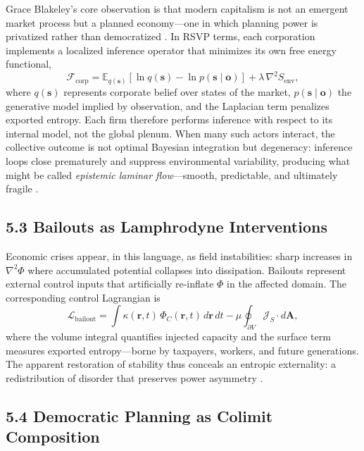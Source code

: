 \documentclass[11pt,a4paper,titlepage]{article}
\theoremstyle{definition}
\begin{document}
Grace Blakeley’s core observation is that modern capitalism is not an emergent
market process but a planned economy—one in which planning power is privatized
rather than democratized \cite{blakeley2024,mirowski2013}.
In RSVP terms, each corporation implements a localized inference operator that
minimizes its own free energy functional,
\begin{equation}
\mathcal{F}_{\text{corp}}
   = \mathbb{E}_{q(\mathbf{s})}
     [\ln q(\mathbf{s}) - \ln p(\mathbf{s}\!\mid\!\mathbf{o})]
     + \lambda\,\nabla^{2}S_{\text{env}},
\label{eq:corp_inference}
\end{equation}
where $q(\mathbf{s})$ represents corporate belief over states of the market,
$p(\mathbf{s}\!\mid\!\mathbf{o})$ the generative model implied by observation,
and the Laplacian term penalizes exported entropy.
Each firm therefore performs inference with respect to its internal model,
not the global plenum.
When many such actors interact, the collective outcome is not optimal Bayesian
integration but degeneracy: inference loops close prematurely and suppress
environmental variability, producing what might be called
\emph{epistemic laminar flow}—smooth, predictable, and ultimately fragile
\cite{friston2010,friston2022}.

\subsection{5.3 Bailouts as Lamphrodyne Interventions}

Economic crises appear, in this language, as field instabilities:
sharp increases in $\nabla^{2}\Phi$ where accumulated potential collapses into
dissipation.  Bailouts represent external control inputs that artificially
re-inflate $\Phi$ in the affected domain.
The corresponding control Lagrangian is
\begin{equation}
\mathcal{L}_{\text{bailout}}
   = \int \kappa(\mathbf{r},t)\,\Phi_C(\mathbf{r},t)\,d\mathbf{r}\,dt
     - \mu\oint_{\partial V}\mathcal{J}_S\!\cdot\!d\mathbf{A},
\label{eq:bailout_operator}
\end{equation}
where the volume integral quantifies injected capacity and the surface term
measures exported entropy—borne by taxpayers, workers, and future generations.
The apparent restoration of stability thus conceals an entropic externality:
a redistribution of disorder that preserves power asymmetry
\cite{minsky1986,keen2011}.

\subsection{5.4 Democratic Planning as Colimit Composition}
\end{document}
